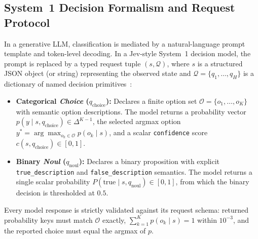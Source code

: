 \documentclass[10pt]{article}
\begin{document}
\subsection{System~1 Decision Formalism and Request Protocol}
\label{sec:protocol}
In a generative LLM, classification is mediated by a natural-language prompt template and token-level decoding.
In a Jev-style System~1 decision model, the prompt is replaced by a typed request tuple $(s, \mathcal{Q})$, where $s$ is a structured JSON object (or string) representing the observed state and $\mathcal{Q} = \{q_1, \dots, q_H\}$ is a dictionary of named decision primitives~\cite{systemone2026api}:
\begin{itemize}
\item \textbf{Categorical \emph{Choice} ($q_{\text{choice}}$):} Declares a finite option set $\mathcal{O} = \{o_1, \dots, o_K\}$ with semantic option descriptions. The model returns a probability vector $p(y \mid s, q_{\text{choice}}) \in \Delta^{K-1}$, the selected argmax option $y^* = \arg\max_{o_k \in \mathcal{O}} p(o_k \mid s)$, and a scalar \texttt{confidence} score $c(s, q_{\text{choice}}) \in [0, 1]$.
\item \textbf{Binary \emph{Noul} ($q_{\text{noul}}$):} Declares a binary proposition with explicit \texttt{true\_description} and \texttt{false\_description} semantics. The model returns a single scalar probability $P(\text{true} \mid s, q_{\text{noul}}) \in [0, 1]$, from which the binary decision is thresholded at $0.5$.
\end{itemize}
Every model response is strictly validated against its request schema: returned probability keys must match $\mathcal{O}$ exactly, $\sum_{k=1}^K p(o_k \mid s) = 1$ within $10^{-3}$, and the reported choice must equal the argmax of $p$.
\end{document}
